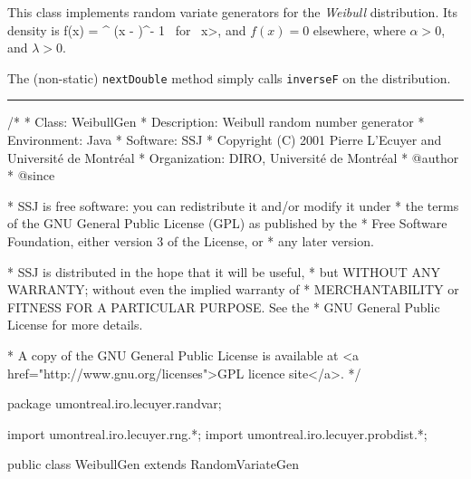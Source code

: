 
This class implements random variate generators for the 
{\em Weibull\/} distribution. Its density is
\eq
   f(x) = \alpha\lambda^{\alpha} (x - \delta)^{\alpha - 1}
          \qquad\mbox{ for }  x>\delta,   
\endeq
and $f(x)=0$ elsewhere, where $\alpha > 0$, and $\lambda > 0$.

The (non-static) \texttt{nextDouble} method simply calls \texttt{inverseF} on the
distribution.

\bigskip\hrule

\begin{code}
\begin{hide}
/*
 * Class:        WeibullGen
 * Description:  Weibull random number generator
 * Environment:  Java
 * Software:     SSJ 
 * Copyright (C) 2001  Pierre L'Ecuyer and Université de Montréal
 * Organization: DIRO, Université de Montréal
 * @author       
 * @since

 * SSJ is free software: you can redistribute it and/or modify it under
 * the terms of the GNU General Public License (GPL) as published by the
 * Free Software Foundation, either version 3 of the License, or
 * any later version.

 * SSJ is distributed in the hope that it will be useful,
 * but WITHOUT ANY WARRANTY; without even the implied warranty of
 * MERCHANTABILITY or FITNESS FOR A PARTICULAR PURPOSE.  See the
 * GNU General Public License for more details.

 * A copy of the GNU General Public License is available at
   <a href="http://www.gnu.org/licenses">GPL licence site</a>.
 */
\end{hide}
package umontreal.iro.lecuyer.randvar;\begin{hide}
import umontreal.iro.lecuyer.rng.*;
import umontreal.iro.lecuyer.probdist.*;
\end{hide}

public class WeibullGen extends RandomVariateGen \begin{hide} {
   private double alpha = -1.0;
   private double lambda = -1.0;
   private double delta = -1.0;
\end{hide}\end{code}

